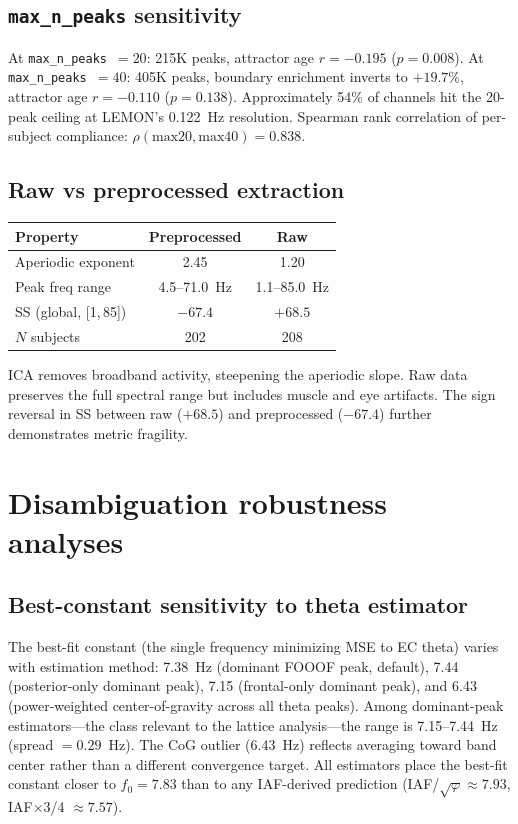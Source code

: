 \documentclass[11pt,a4paper]{article}
\newcommand{\phisym}{\varphi}
\newcommand{\fzero}{f_0}
\begin{document}
\subsection{\texttt{max\_n\_peaks} sensitivity}

At \texttt{max\_n\_peaks}~$= 20$: 215K peaks, attractor age $r = -0.195$ ($p = 0.008$). At \texttt{max\_n\_peaks}~$= 40$: 405K peaks, boundary enrichment inverts to $+19.7\%$, attractor age $r = -0.110$ ($p = 0.138$). Approximately 54\% of channels hit the 20-peak ceiling at LEMON's 0.122~Hz resolution. Spearman rank correlation of per-subject compliance: $\rho(\text{max20}, \text{max40}) = 0.838$.

\subsection{Raw vs preprocessed extraction}

\begin{table}[H]
\centering
\begin{tabular}{lcc}
\toprule
Property & Preprocessed & Raw \\
\midrule
Aperiodic exponent & 2.45 & 1.20 \\
Peak freq range & 4.5--71.0~Hz & 1.1--85.0~Hz \\
SS (global, [1,\,85]) & $-67.4$ & $+68.5$ \\
$N$ subjects & 202 & 208 \\
\bottomrule
\end{tabular}
\end{table}

ICA removes broadband activity, steepening the aperiodic slope. Raw data preserves the full spectral range but includes muscle and eye artifacts. The sign reversal in SS between raw ($+68.5$) and preprocessed ($-67.4$) further demonstrates metric fragility.

\section{Disambiguation robustness analyses}
\label{app:disambiguation_robustness}

\subsection{Best-constant sensitivity to theta estimator}

The best-fit constant (the single frequency minimizing MSE to EC theta) varies with estimation method: 7.38~Hz (dominant FOOOF peak, default), 7.44 (posterior-only dominant peak), 7.15 (frontal-only dominant peak), and 6.43 (power-weighted center-of-gravity across all theta peaks). Among dominant-peak estimators---the class relevant to the lattice analysis---the range is 7.15--7.44~Hz (spread $= 0.29$~Hz). The CoG outlier (6.43~Hz) reflects averaging toward band center rather than a different convergence target. All estimators place the best-fit constant closer to $\fzero = 7.83$ than to any IAF-derived prediction (IAF/$\sqrt{\phisym} \approx 7.93$, IAF$\times$3/4 $\approx 7.57$).
\end{document}
